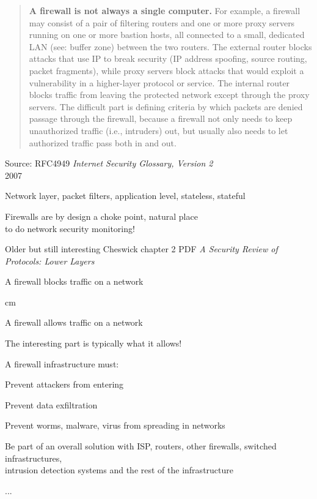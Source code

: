 \documentclass[Screen16to9,17pt]{foils}
\begin{document}
\begin{quote}\small
{\bf A firewall is not always a single computer.} For example, a firewall may consist of a pair of filtering routers and one or more proxy servers running on one or more bastion hosts, all connected to a small, dedicated LAN (see: buffer zone) between the two routers. The external router blocks attacks that use IP to break security (IP address spoofing, source routing, packet fragments), while proxy servers block attacks that would exploit a vulnerability in a higher-layer protocol or service. The internal router blocks traffic from leaving the protected network except through the proxy servers. The difficult part is defining criteria by which packets are denied passage through the firewall, because a firewall not only needs to keep unauthorized traffic (i.e., intruders) out, but usually also needs to let authorized traffic pass both in and out.
\end{quote}
{\footnotesize Source: RFC4949 \emph{Internet Security Glossary, Version 2}\\
 2007}

\begin{list2}
\item Network layer, packet filters, application level, stateless, stateful
\item Firewalls are by design a choke point, natural place \\
to do network security monitoring!
\item Older but still interesting Cheswick chapter 2 PDF
\emph{A Security Review of Protocols:
Lower Layers}\\
\end{list2}








\centerline{\hlkbig A firewall {\color{security6blue}blocks traffic} on a network}

 cm
\pause

\centerline{\hlkbig A firewall {\color{red}allows traffic} on a network}
{\small The interesting part is typically what it allows!}

\begin{list1}
\item A firewall infrastructure must:
\begin{list2}
\item Prevent attackers from entering
\item Prevent data exfiltration
\item Prevent worms, malware, virus from spreading in networks
\item Be part of an overall solution with ISP, routers, other firewalls, switched infrastructures,\\
  intrusion detection systems and the rest of the infrastructure
\item ...
\end{list2}
\end{list1}
\end{document}

